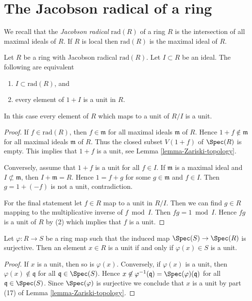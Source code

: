 \section{The Jacobson radical of a ring}
\label{section-radical}

\noindent
We recall that the {\it Jacobson radical} $\text{rad}(R)$ of a ring $R$
is the intersection of all maximal ideals of $R$. If $R$ is local
then $\text{rad}(R)$ is the maximal ideal of $R$.

\begin{lemma}
\label{lemma-contained-in-radical}
Let $R$ be a ring with Jacobson radical $\text{rad}(R)$.
Let $I \subset R$ be an ideal. The following are
equivalent
\begin{enumerate}
\item $I \subset \text{rad}(R)$, and
\item every element of $1 + I$ is a unit in $R$.
\end{enumerate}
In this case every element of $R$ which maps to a unit of $R/I$ is a unit.
\end{lemma}

\begin{proof}
If $f \in \text{rad}(R)$, then $f \in \mathfrak m$ for all
maximal ideals $\mathfrak m$ of $R$. Hence $1 + f \not \in \mathfrak m$
for all maximal ideals $\mathfrak m$ of $R$. Thus the closed
subset $V(1 + f)$ of $\Spec(R)$ is empty. This implies
that $1 + f$ is a unit, see Lemma \ref{lemma-Zariski-topology}.

\medskip\noindent
Conversely, assume that $1 + f$ is a unit for all $f \in I$.
If $\mathfrak m$ is a maximal ideal and $I \not \subset \mathfrak m$,
then $I + \mathfrak m = R$. Hence $1 = f + g$ for some $g \in \mathfrak m$
and $f \in I$. Then $g = 1 + (-f)$ is not a unit, contradiction.

\medskip\noindent
For the final statement let $f \in R$ map to a unit in $R/I$.
Then we can find $g \in R$ mapping to the multiplicative inverse
of $f \bmod I$. Then $fg = 1 \bmod I$. Hence $fg$ is a unit of $R$
by (2) which implies that $f$ is a unit.
\end{proof}

\begin{lemma}
\label{lemma-surjective-on-spec-units}
Let $\varphi : R \to S$ be a ring map such that the induced map
$\Spec(S) \to \Spec(R)$ is surjective. Then an element $x \in R$
is a unit if and only if $\varphi(x) \in S$ is a unit.
\end{lemma}

\begin{proof}
If $x$ is a unit, then so is $\varphi(x)$. Conversely, if $\varphi(x)$
is a unit, then $\varphi(x) \not \in \mathfrak q$ for all
$\mathfrak q \in \Spec(S)$. Hence
$x \not \in \varphi^{-1}(\mathfrak q) = \Spec(\varphi)(\mathfrak q)$
for all $\mathfrak q \in \Spec(S)$. Since $\Spec(\varphi)$ is surjective
we conclude that $x$ is a unit by
part (17) of Lemma \ref{lemma-Zariski-topology}.
\end{proof}




